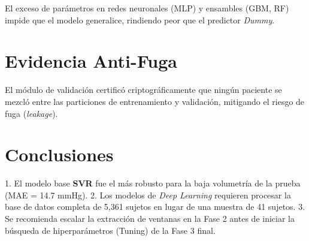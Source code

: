 \documentclass[11pt,a4paper]{article}
\begin{document}
El exceso de parámetros en redes neuronales (MLP) y ensambles (GBM, RF) impide que el modelo generalice, rindiendo peor que el predictor \textit{Dummy}.

\section{Evidencia Anti-Fuga}
El módulo de validación certificó criptográficamente que ningún paciente se mezcló entre las particiones de entrenamiento y validación, mitigando el riesgo de fuga (\textit{leakage}).

\section{Conclusiones}
1. El modelo base \textbf{SVR} fue el más robusto para la baja volumetría de la prueba (MAE = 14.7 mmHg).
2. Los modelos de \textit{Deep Learning} requieren procesar la base de datos completa de 5,361 sujetos en lugar de una muestra de 41 sujetos.
3. Se recomienda escalar la extracción de ventanas en la Fase 2 antes de iniciar la búsqueda de hiperparámetros (Tuning) de la Fase 3 final.
\end{document}
